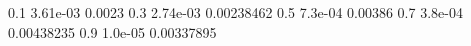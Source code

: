 0.1 3.61e-03 0.0023
0.3 2.74e-03 0.00238462
0.5 7.3e-04 0.00386
0.7 3.8e-04 0.00438235
0.9 1.0e-05 0.00337895